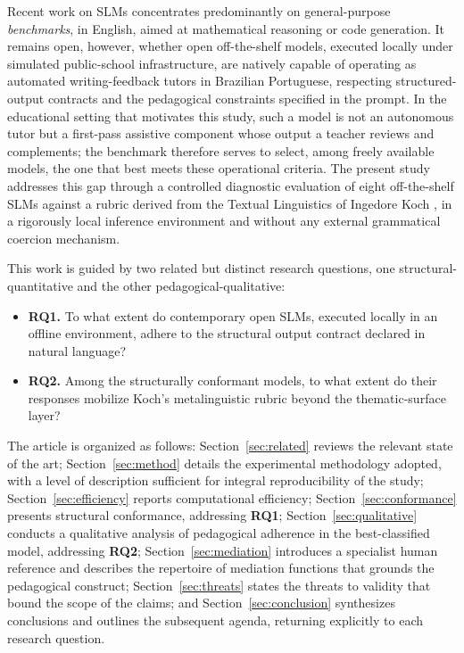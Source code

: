 \documentclass{sbc2023}%
\begin{document}
Recent work on SLMs concentrates predominantly on general-purpose \textit{benchmarks}, in English, aimed at mathematical reasoning or code generation. It remains open, however, whether open off-the-shelf models, executed locally under simulated public-school infrastructure, are natively capable of operating as automated writing-feedback tutors in Brazilian Portuguese, respecting structured-output contracts and the pedagogical constraints specified in the prompt. In the educational setting that motivates this study, such a model is not an autonomous tutor but a first-pass assistive component whose output a teacher reviews and complements; the benchmark therefore serves to select, among freely available models, the one that best meets these operational criteria. The present study addresses this gap through a controlled diagnostic evaluation of eight off-the-shelf SLMs against a rubric derived from the Textual Linguistics of Ingedore Koch \citep{koch2018coesao,koch2020introducao}, in a rigorously local inference environment and without any external grammatical coercion mechanism.

This work is guided by two related but distinct research questions, one structural-quantitative and the other pedagogical-qualitative:

\begin{itemize}
\item \textbf{RQ1.} To what extent do contemporary open SLMs, executed locally in an offline environment, adhere to the structural output contract declared in natural language?
\item \textbf{RQ2.} Among the structurally conformant models, to what extent do their responses mobilize Koch's metalinguistic rubric beyond the thematic-surface layer?
\end{itemize}

The article is organized as follows: Section~\ref{sec:related} reviews the relevant state of the art; Section~\ref{sec:method} details the experimental methodology adopted, with a level of description sufficient for integral reproducibility of the study; Section~\ref{sec:efficiency} reports computational efficiency; Section~\ref{sec:conformance} presents structural conformance, addressing \textbf{RQ1}; Section~\ref{sec:qualitative} conducts a qualitative analysis of pedagogical adherence in the best-classified model, addressing \textbf{RQ2}; Section~\ref{sec:mediation} introduces a specialist human reference and describes the repertoire of mediation functions that grounds the pedagogical construct; Section~\ref{sec:threats} states the threats to validity that bound the scope of the claims; and Section~\ref{sec:conclusion} synthesizes conclusions and outlines the subsequent agenda, returning explicitly to each research question.
\end{document}
